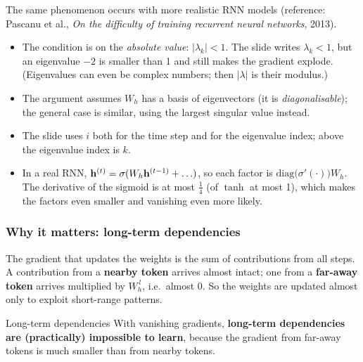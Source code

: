 The same phenomenon occurs with more realistic RNN models (reference: Pascanu et al.,
\emph{On the difficulty of training recurrent neural networks}, 2013).

\begin{nbwarning}
\begin{itemize}[nosep]
  \item The condition is on the \emph{absolute value}: $|\lambda_k| < 1$. The slide
        writes $\lambda_k < 1$, but an eigenvalue $-2$ is smaller than 1 and still
        makes the gradient explode. (Eigenvalues can even be complex numbers; then
        $|\lambda|$ is their modulus.)
  \item The argument assumes $W_h$ has a basis of eigenvectors (it is
        \emph{diagonalisable}); the general case is similar, using the largest
        singular value instead.
  \item The slide uses $i$ both for the time step and for the eigenvalue index; above
        the eigenvalue index is $k$.
  \item In a real RNN, $\mathbf{h}^{(t)} = \sigma(W_h \mathbf{h}^{(t-1)} + \ldots)$, so each
        factor is $\mathrm{diag}\bigl(\sigma'(\cdot)\bigr) W_h$. The derivative of the
        sigmoid is at most $\frac14$ (of $\tanh$ at most 1), which makes the factors
        even smaller and vanishing even more likely.
\end{itemize}
\end{nbwarning}

\subsubsection{Why it matters: long-term dependencies}

The gradient that updates the weights is the sum of contributions from all steps. A
contribution from a \textbf{nearby token} arrives almost intact; one from a
\textbf{far-away token} arrives multiplied by $W_h^{\,l}$, i.e.\ almost 0. So the
weights are updated almost only to exploit short-range patterns.

\begin{nbfact}{Long-term dependencies}
With vanishing gradients, \textbf{long-term dependencies are (practically) impossible
to learn}, because the gradient from far-away tokens is much smaller than from nearby
tokens.
\end{nbfact}

